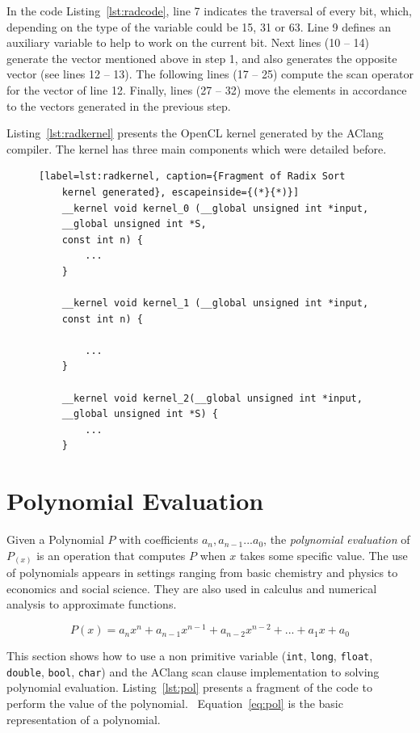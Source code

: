 \documentclass[Ingles]{ic-tese-v1}
\newcommand{\req}[1]{Equation~\ref{eq:#1}}
\newcommand{\ttt}[1]{{\texttt{#1}}}
\newcommand{\rlst}[1]{Listing~\ref{lst:#1}}
\begin{document}
In the code \rlst{radcode}, line 7 indicates the traversal of  every bit,
which, depending on the type of the variable could be 15, 31 or 63. Line 9
defines an auxiliary variable to help to work on  the current bit. Next lines
(10 -- 14) generate the vector mentioned above in step 1, and also
generates the opposite vector (see lines 12 -- 13).  The following lines (17 --
25) compute the scan operator for the vector of line 12. Finally, lines (27
-- 32) move the elements in accordance to the vectors generated in the previous
step.

\rlst{radkernel} presents the OpenCL kernel generated by the AClang compiler.
The kernel has three main components which were detailed before.

\begin{figure}[t]
	\lstset{basicstyle=\scriptsize}
	\begin{lstlisting}[label=lst:radkernel, caption={Fragment of Radix Sort
	kernel generated}, escapeinside={(*}{*)}]
	__kernel void kernel_0 (__global unsigned int *input,
	__global unsigned int *S,
	const int n) {
		...
	}

	__kernel void kernel_1 (__global unsigned int *input,
	const int n) {

		...
	}

	__kernel void kernel_2(__global unsigned int *input,
	__global unsigned int *S) {
		...
	}
	\end{lstlisting}
\end{figure}

\section{Polynomial Evaluation}
\label{sec:PolEval}

Given a Polynomial $P$ with coefficients $a_{n}, a_{n-1} ... a_{0}$, the \textit{polynomial evaluation} of $P_{(x)}$ is an operation
that computes $P$ when $x$ takes some specific value. The use of polynomials
appears in settings ranging from basic chemistry and physics to economics and social science.
They are also used in calculus and numerical analysis to approximate  functions.

\begin{equation}
P(x) = a_{n}x^n + a_{n-1}x^{n-1} + a_{n-2}x^{n-2} + ... + a_{1}x + a_{0}
\label{eq:pol}
\end{equation}

This section shows how to use a non primitive variable (\ttt{int}, \ttt{long}, \ttt{float}, \ttt{double}, \ttt{bool}, \ttt{char})
and the AClang scan clause implementation to solving polynomial evaluation. \rlst{pol} presents
a fragment of the code to perform the value of the polynomial. ~\req{pol} is the basic
representation of a polynomial.
\end{document}
